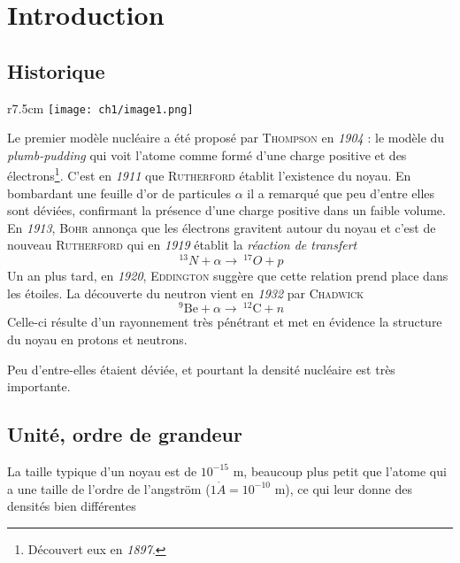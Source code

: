 \chapter{Introduction}

\iffalse
	\begin{wrapfigure}[12]{l}{5cm}
	\vspace{-5mm}
	\texttt{[image: ch1/image1.png]}
	\captionof{figure}{ }
	\end{wrapfigure}
\fi	

\section{Historique}
	\begin{wrapfigure}[10]{r}{7.5cm}
	\vspace{-5mm}
	\texttt{[image: ch1/image1.png]}
	\end{wrapfigure}
Le premier modèle nucléaire a été proposé par \textsc{Thompson} en \textit{1904} : le modèle du 
\textit{plumb-pudding} qui voit l'atome comme formé d'une charge positive et des électrons\footnote{Découvert 
eux en \textit{1897}.}. C'est en \textit{1911} que \textsc{Rutherford} établit l'existence du noyau. En 
bombardant une feuille d'or de particules $\alpha$ il a remarqué que peu d'entre elles sont déviées, 
confirmant la présence d'une charge positive dans un faible volume.\\

En \textit{1913}, \textsc{Bohr} annonça que les électrons gravitent autour du noyau et c'est de nouveau
\textsc{Rutherford} qui en \textit{1919} établit la \textit{réaction de transfert} 
\begin{equation}
\ ^{13}N+\alpha\to\ ^{17}O+p
\end{equation}
Un an plus tard, en \textit{1920}, \textsc{Eddington} suggère que cette relation prend place dans les 
étoiles. La découverte du neutron vient en \textit{1932} par \textsc{Chadwick}
\begin{equation}
\ ^9\text{Be} + \alpha\to\ ^{12}\text{C}+n
\end{equation}
Celle-ci résulte d'un rayonnement très pénétrant et met en évidence la structure du noyau en protons et 
neutrons.

Peu d'entre-elles étaient déviée, et pourtant la densité nucléaire est très importante.


\newpage
\section{Unité, ordre de grandeur}
La taille typique d'un noyau est de $10^{-15}$ m, beaucoup plus petit que l'atome qui a une taille 
de l'ordre de l'angström ($1 \mathring{A}=10^{-10}$ m), ce qui leur donne des densités bien différentes

